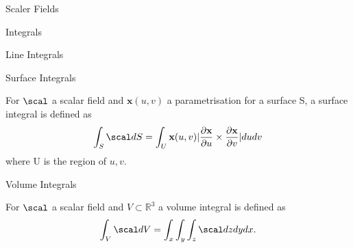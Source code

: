 \documentclass[12pt, letterpaper]{article}
\newcommand{\x}{\textbf{x}}
\newcommand{\R}{\mathbb{R}}
\newcommand{\pder}[2]{\frac{\partial{} #1}{\partial{} #2}}
\begin{document}
\begin{section}{Scaler Fields}
\begin{subsection}{Integrals}
\begin{subsubsection}{Line Integrals}
    \end{subsubsection}

    \begin{subsubsection}{Surface Integrals}

      For \(\scal\) a scalar field and \(\x(u, v)\) a parametrisation for a
      surface S, a surface integral is defined as \[\int_{S} \scal dS =
        \int_{U} \x(u, v) | \pder{\x}{u} \times \pder{\x}{v} | dudv\]
      where U is the region of \(u, v\).

    \end{subsubsection}

    \begin{subsubsection}{Volume Integrals}

      For \(\scal\) a scalar field and \(V \subset \R^{3}\) a volume integral
      is defined as \[\int_{V} \scal dV = \int_{x} \int_{y} \int_{z} \scal
        dzdydx.\]

    \end{subsubsection}

  \end{subsection}

\end{section}

\end{document}
